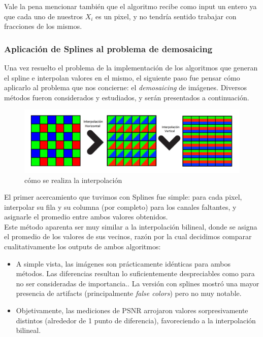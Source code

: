 \documentclass[a4paper]{article}
\begin{document}
Vale la pena mencionar también que el algoritmo recibe como input un entero ya que cada uno de nuestros $X_i$ es un pixel, y no tendría sentido trabajar con fracciones de los mismos. \\

\subsubsection*{Aplicación de Splines al problema de demosaicing}

Una vez resuelto el problema de la implementación de los algoritmos que generan el spline e interpolan valores en el mismo, el siguiente paso fue pensar c\'omo aplicarlo al problema que nos concierne: el \textit{demosaicing} de imágenes. Diversos métodos fueron considerados y estudiados, y serán presentados a continuación.

\begin{figure}[h!]
	\begin{center}
	    \includegraphics[scale=0.45]{imagenes/Splines/splines1.png}
	\end{center}
	\caption{cómo se realiza la interpolación}
	\label{splines1}
\end{figure}

\pagebreak
El primer acercamiento que tuvimos con Splines fue simple: para cada pixel, interpolar su fila y su columna (por completo) para los canales faltantes, y asignarle el promedio entre ambos valores obtenidos. \\
Este método aparenta ser muy similar a la interpolación bilineal, donde se asigna el promedio de los valores de sus vecinos, razón por la cual decidimos comparar cualitativamente los outputs de ambos algoritmos:
\begin{itemize}
\item A simple vista, las imágenes son prácticamente idénticas para ambos métodos. Las diferencias resultan lo suficientemente despreciables como para no ser consideradas de importancia.. La versión con splines mostró una mayor presencia de artifacts (principalmente \textit{false colors}) pero no muy notable.
\item Objetivamente, las mediciones de PSNR arrojaron valores sorpresivamente distintos (alrededor de 1 punto de diferencia), favoreciendo a la interpolación bilineal.
\end{itemize}
\end{document}
